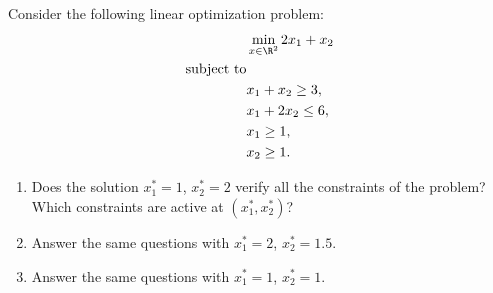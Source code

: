  Consider the following linear optimization problem:
\begin{align*}
 & \min_{x \in \R^2} 2 x_1 + x_2 \\
 \text{subject to} & \\
 & x_1 + x_2 \geq 3, \\
 & x_1 + 2 x_2 \leq 6, \\
 & x_1 \geq 1, \\
 & x_2 \geq 1.
\end{align*}

\begin{enumerate}
    \item Does the solution $x_1^* = 1$, $x_2^* = 2$ verify all the constraints of the problem? Which constraints are active at $(x_1^*, x_2^*)$?
    \item Answer the same questions with $x_1^* = 2$, $x_2^* = 1.5$.
    \item Answer the same questions with $x_1^* = 1$, $x_2^* = 1$.
\end{enumerate}


